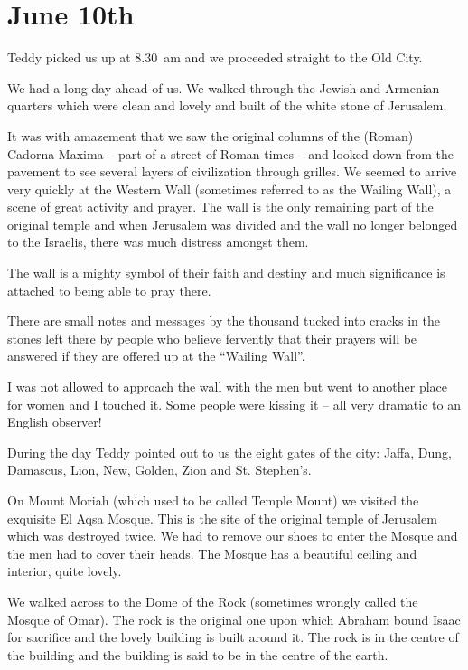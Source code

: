 \section{June 10th}

Teddy picked us up at 8.30~am and we proceeded straight to the Old
City.

We had a long day ahead of us.  We walked through the Jewish and
Armenian quarters which were clean and lovely and built of the white
stone of Jerusalem.

It was with amazement that we saw the original columns of the (Roman)
Cadorna Maxima -- part of a street of Roman times -- and looked down
from the pavement to see several layers of civilization through
grilles. We seemed to arrive very quickly at the Western Wall
(sometimes referred to as the Wailing Wall), a scene of great activity
and prayer. The wall is the only remaining part of the original temple
and when Jerusalem was divided and the wall no longer belonged to the
Israelis, there was much distress amongst them.

The wall is a mighty symbol of their faith and destiny and much
significance is attached to being able to pray there.

There are small notes and messages by the thousand tucked into cracks
in the stones left there by people who believe fervently that their
prayers will be answered if they are offered up at the ``Wailing
Wall''.

I was not allowed to approach the wall with the men but went to
another place for women and I touched it. Some people were kissing it
-- all very dramatic to an English observer!

During the day Teddy pointed out to us the eight gates of the city:
Jaffa, Dung, Damascus, Lion, New, Golden, Zion and St. Stephen's.

On Mount Moriah (which used to be called Temple Mount) we visited the
exquisite El Aqsa Mosque. This is the site of the original temple of
Jerusalem which was destroyed twice. We had to remove our shoes to
enter the Mosque and the men had to cover their heads. The Mosque has
a beautiful ceiling and interior, quite lovely.

We walked across to the Dome of the Rock (sometimes wrongly called the
Mosque of Omar). The rock is the original one upon which Abraham bound
Isaac for sacrifice and the lovely building is built around it. The
rock is in the centre of the building and the building is said to be
in the centre of the earth.


